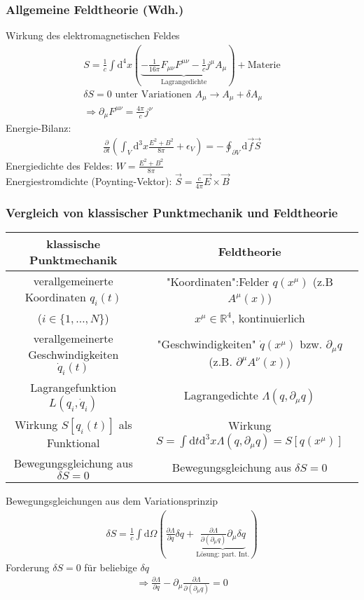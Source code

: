 \documentclass[a4paper]{article}
\begin{document}
\subsubsection{Allgemeine Feldtheorie (Wdh.)}
Wirkung des elektromagnetischen Feldes 
\begin{align}
S=\frac{1}{c}\int \mathrm{d}^4x\left(\underbrace{-\frac{1}{16\pi}F_{\mu\nu}F^{\mu\nu}-
\frac{1}{c}j^\mu A_\mu}_{\text{Lagrangedichte}} \right) +\text{Materie}\\
\delta S=0 \text{ unter Variationen } A_\mu \rightarrow A_\mu+\delta A_\mu\\
\Rightarrow \partial_\mu F^{\mu\nu}=\frac{4\pi}{c}j^\nu
\end{align}
Energie-Bilanz:
\begin{align}
\frac{\partial}{\partial t}\left(\int_V \mathrm{d}^3x
\frac{E^2+B^2}{8\pi}+\epsilon_V\right)=-\oint_{\partial V} \mathrm{d}\vec{f}\vec{S}
\end{align}
Energiedichte des Feldes: $W=\frac{E^2+B^2}{8\pi}$\\
Energiestromdichte (Poynting-Vektor):
$\vec{S}=\frac{c}{4\pi}\vec{E}\times\vec{B}$
\subsubsection{Vergleich von klassischer Punktmechanik und Feldtheorie}

\begin{tabular}{c|c}
klassische Punktmechanik & Feldtheorie\\  
\hline\hline
verallgemeinerte Koordinaten $q_i(t)$ &
"Koordinaten":Felder $q(x^\mu)$ (z.B $A^\mu(x)$)
\\
($i\in \{1,\ldots,N\}$)&$x^\mu \in \mathbb{R}^4$, kontinuierlich\\
verallgemeinerte Geschwindigkeiten $\dot{q}_i(t)$&
"Geschwindigkeiten" $\dot{q}(x^\mu)$ bzw. $\partial_\mu q$ (z.B.
$\partial^\mu A^\nu(x)$)\\
Lagrangefunktion $L(q_i,\dot{q}_i)$ & Lagrangedichte $\Lambda(q,\partial_\mu
q)$\\
Wirkung $S[q_i(t)]$ als Funktional & Wirkung $S=\int \mathrm{d}t \mathrm{d}^3x
\Lambda(q,\partial_\mu q)=S[q(x^\mu)]$\\
Bewegungsgleichung aus $\delta S=0$&Bewegungsgleichung aus $\delta S=0$\\
\end{tabular}

Bewegungsgleichungen aus dem Variationsprinzip
\begin{align}
\delta S=\frac{1}{c}\int \mathrm{d}\Omega \left( \frac{\partial
\Lambda}{\partial\!q}\delta\!q +\underbrace{\frac{\partial \Lambda}{\partial\!
(\partial_\mu\! q)} \partial_\mu\! \delta\!q}_{\text{Lösung: part. Int.}}
\right)
\end{align}
Forderung $\delta S=0$ für beliebige $\delta q$
\begin{align}
\Rightarrow  \frac{\partial
\Lambda}{\partial\!q} -\partial_\mu \frac{\partial \Lambda}{\partial\!
(\partial_\mu\! q)}=0
\end{align}
\end{document}
